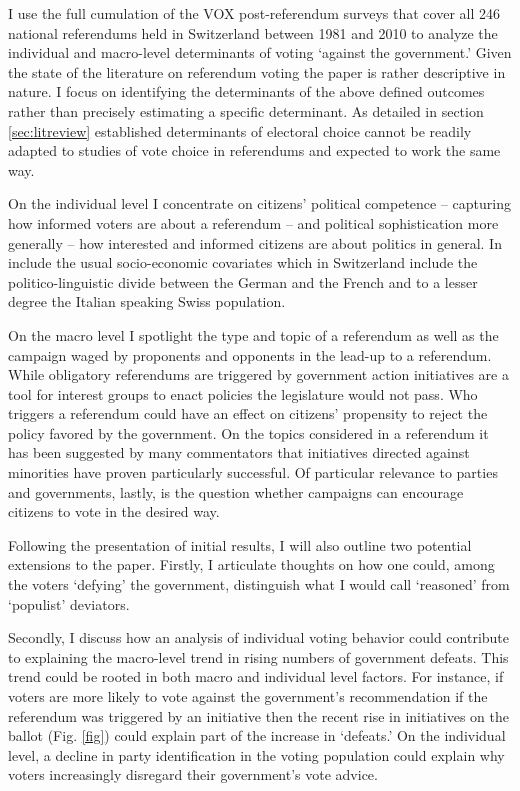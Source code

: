 \documentclass[11pt,a4paper]{article}
\begin{document}
    I use the full cumulation of the VOX post-referendum surveys that cover all 246 national referendums held in Switzerland between 1981 and 2010 to analyze the individual and macro-level determinants of voting `against the government.' Given the state of the literature on referendum voting the paper is rather descriptive in nature. I focus on identifying the determinants of the above defined outcomes rather than precisely estimating a specific determinant. As detailed in section \ref{sec:litreview} established determinants of electoral choice cannot be readily adapted to studies of vote choice in referendums and expected to work the same way. 
    
    On the individual level I concentrate on citizens' political competence -- capturing how informed voters are about a referendum -- and political sophistication more generally -- how interested and informed citizens are about politics in general. In include the usual socio-economic covariates which in Switzerland include the politico-linguistic divide between the German and the French and to a lesser degree the Italian speaking Swiss population. 
    
    On the macro level I spotlight the type and topic of a referendum as well as the campaign waged by proponents and opponents in the lead-up to a referendum. While obligatory referendums are triggered by government action initiatives are a tool for interest groups to enact policies the legislature would not pass. Who triggers a referendum could have an effect on citizens' propensity to reject the policy favored by the government. On the topics considered in a referendum it has been suggested by many commentators that initiatives directed against minorities have proven particularly successful. Of particular relevance to parties and governments, lastly, is the question whether campaigns can encourage citizens to vote in the desired way.
    
    Following the presentation of initial results, I will also outline two potential extensions to the paper. Firstly, I articulate thoughts on how one could, among the voters `defying' the government, distinguish what I would call `reasoned' from `populist' deviators.  
    
    Secondly, I discuss how an analysis of individual voting behavior could contribute to explaining the macro-level trend in rising numbers of government defeats. This trend could be rooted in both macro and individual level factors. For instance, if voters are more likely to vote against the government's recommendation if the referendum was triggered by an initiative then the recent rise in initiatives on the ballot (Fig. \ref{fig}) could explain part of the increase in `defeats.' On the individual level, a decline in party identification in the voting population could explain why voters increasingly disregard their government's vote advice.
    
\end{document}
